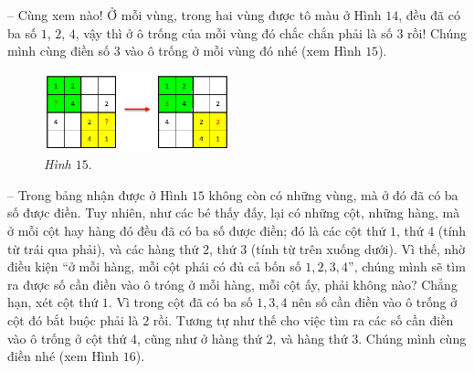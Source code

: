 		-- Cùng xem nào! Ở mỗi vùng, trong hai vùng được tô màu ở Hình $14$, đều đã có ba số $1$, $2$, $4$, vậy thì ở ô trống của mỗi vùng đó chắc chắn phải là số $3$ rồi! Chúng mình cùng điền số $3$ vào ô trống ở mỗi vùng đó nhé (xem Hình $15$).
		\vskip 0.1cm
		\begin{figure}
			\centering
			\captionsetup{labelformat= empty, justification=centering}
			\includegraphics[width=0.48\textwidth]{pic4}
			\caption{\small\textit{Hình $15.$}}
			\vspace*{-10pt}
		\end{figure}
	-- Trong bảng nhận được ở Hình $15$ không còn có những vùng, mà ở đó đã có ba số được điền. Tuy nhiên, như các bé thấy đấy, lại có những cột, những hàng, mà ở mỗi cột hay hàng đó đều đã có ba số được điền; đó là các cột thứ $1$, thứ $4$ (tính từ trái qua phải), và các hàng thứ $2$, thứ $3$ (tính từ trên xuống dưới). Vì thế, nhờ điều kiện “ở mỗi hàng, mỗi cột phái có đủ cả bốn số $1, 2, 3, 4$”, chúng mình sẽ tìm ra được số cần điền vào ô tróng ở mỗi hàng, mỗi cột ấy, phải không nào? Chẳng hạn, xét cột thứ $1$. Vì trong cột đã có ba số $1, 3, 4$ nên số cần điền vào ô trống ở cột đó bắt buộc phải là $2$ rồi. Tương tự như thế cho việc tìm ra các số cần điền vào ô trống ở cột thứ $4$, cũng như ở hàng thứ $2$, và hàng thứ $3$. Chúng mình cùng điền nhé (xem Hình $16$).
